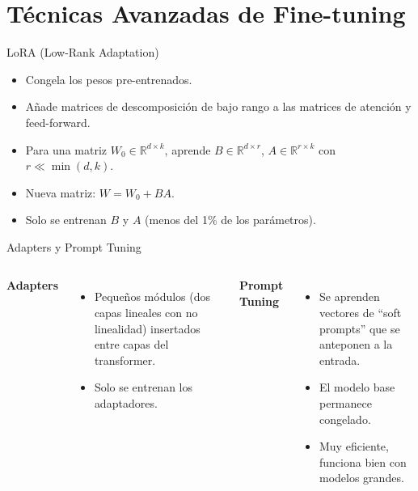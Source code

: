 \documentclass[aspectratio=169, 10pt, xcolor=table]{beamer}
\begin{document}
\section{Técnicas Avanzadas de Fine-tuning}

\begin{frame}{LoRA (Low-Rank Adaptation)}
    \begin{itemize}
        \item Congela los pesos pre-entrenados.
        \item Añade matrices de descomposición de bajo rango a las matrices de atención y feed-forward.
        \item Para una matriz $W_0 \in \mathbb{R}^{d \times k}$, aprende $B \in \mathbb{R}^{d \times r}$, $A \in \mathbb{R}^{r \times k}$ con $r \ll \min(d,k)$.
        \item Nueva matriz: $W = W_0 + BA$.
        \item Solo se entrenan $B$ y $A$ (menos del 1\% de los parámetros).
    \end{itemize}
\end{frame}

\begin{frame}{Adapters y Prompt Tuning}
    \begin{columns}[t]
        \textbf{Adapters}
        \begin{itemize}
            \item Pequeños módulos (dos capas lineales con no linealidad) insertados entre capas del transformer.
            \item Solo se entrenan los adaptadores.
        \end{itemize}
        \textbf{Prompt Tuning}
        \begin{itemize}
            \item Se aprenden vectores de ``soft prompts'' que se anteponen a la entrada.
            \item El modelo base permanece congelado.
            \item Muy eficiente, funciona bien con modelos grandes.
        \end{itemize}
    \end{columns}
\end{frame}
\end{document}
